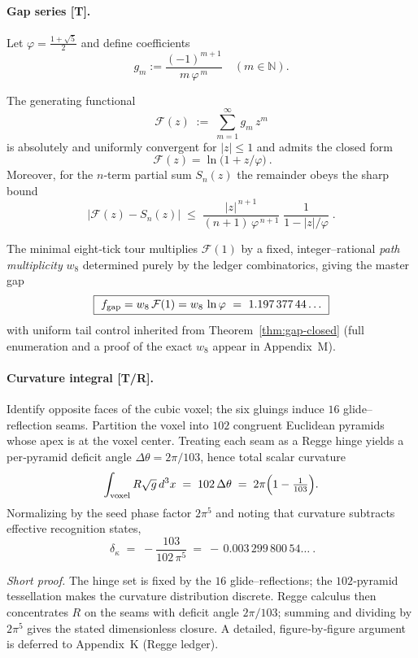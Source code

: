 \documentclass[11pt]{article}
\begin{document}
\paragraph{Gap series [T].}
Let $\varphi=\tfrac{1+\sqrt5}{2}$ and define coefficients
\[
g_m:=\frac{(-1)^{m+1}}{m\,\varphi^{\,m}}\quad(m\in\mathbb N).
\]
\begin{theorem}
\label{thm:gap-closed}
The generating functional
\[
\mathcal F(z)\;:=\;\sum_{m=1}^{\infty} g_m\,z^{m}
\]
is absolutely and uniformly convergent for $|z|\le 1$ and admits the closed form
\[
\boxed{~\mathcal F(z)=\ln\!\bigl(1+z/\varphi\bigr)~}.
\]
Moreover, for the $n$‑term partial sum $S_n(z)$ the remainder obeys the sharp bound
\[
\bigl|\mathcal F(z)-S_n(z)\bigr|
\;\le\; \frac{|z|^{\,n+1}}{(n+1)\,\varphi^{\,n+1}}\;\frac{1}{1-|z|/\varphi}\;.
\]
\end{theorem}
\noindent The minimal eight‑tick tour multiplies $\mathcal F(1)$ by a fixed, integer–rational \emph{path multiplicity} $w_{8}$ determined purely by the ledger combinatorics, giving the master gap
\[
\boxed{~f_{\rm gap}=w_{8}\,\mathcal F(1)=w_{8}\,\ln\varphi~=~1.197\,377\,44\ldots~}
\]
with uniform tail control inherited from Theorem~\ref{thm:gap-closed} (full enumeration and a proof of the exact $w_{8}$ appear in Appendix~M). %

\paragraph{Curvature integral [T/R].}
\begin{proposition}
\label{prop:curv}
Identify opposite faces of the cubic voxel; the six gluings induce $16$ glide–reflection seams. Partition the voxel into $102$ congruent Euclidean pyramids whose apex is at the voxel center. Treating each seam as a Regge hinge yields a per‑pyramid deficit angle $\Delta\theta=2\pi/103$, hence total scalar curvature
\[
\int_{\text{voxel}} R\sqrt g\,d^{3}x \;=\; 102\,\Delta\theta \;=\;2\pi\Bigl(1-\tfrac1{103}\Bigr).
\]
Normalizing by the seed phase factor $2\pi^{5}$ and noting that curvature subtracts effective recognition states,
\[
\boxed{~\delta_\kappa\;=\;-\frac{103}{102\,\pi^{5}}~=~-\,0.003\,299\,800\,54\ldots~}.
\]
\end{proposition}
\noindent \emph{Short proof.} The hinge set is fixed by the $16$ glide–reflections; the $102$‑pyramid tessellation makes the curvature distribution discrete. Regge calculus then concentrates $R$ on the seams with deficit angle $2\pi/103$; summing and dividing by $2\pi^{5}$ gives the stated dimensionless closure. A detailed, figure‑by‑figure argument is deferred to Appendix~K (Regge ledger). %
\end{document}
